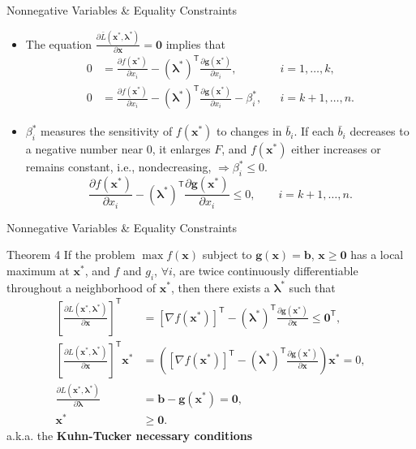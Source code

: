 \documentclass[aspectratio=169,hyperref,UTF8,CJK]{beamer}
\newcommand{\trans}{\mathsf{T}}
\newcommand{\vect}[1]{\boldsymbol{#1}}
\begin{document}
\begin{frame}{Nonnegative Variables \& Equality Constraints}
  \scriptsize
  \begin{itemize}
    \item The equation $\frac{\partial\bar L(\vect{x}^{*},\vect{\lambda}^{*})}{\partial\vect{x}}=\vect{0}$ implies that
      \begin{align*}
        0&=\frac{\partial f(\vect{x}^{*})}{\partial x_i}
          -(\vect{\lambda}^{*})^{\trans}\frac{\partial\vect{g}(\vect{x}^{*})}{\partial x_i},
          &&i=1,\ldots,k,\\
        0&=\frac{\partial f(\vect{x}^{*})}{\partial x_i}
          -(\vect{\lambda}^{*})^{\trans}\frac{\partial\vect{g}(\vect{x}^{*})}{\partial x_i}-\beta_i^{*},
          &&i=k+1,\ldots,n.
      \end{align*}
    \item $\beta_i^{*}$ measures the sensitivity of $f(\vect{x}^{*})$ to changes in $\bar b_i$. If each $\bar b_i$ decreases to a negative number near $0$, it enlarges $F$, and $f(\vect{x}^{*})$ either increases or remains constant, i.e., nondecreasing, $\Longrightarrow\beta_i^{*}\le0$.
      \begin{equation*}
        \frac{\partial f(\vect{x}^{*})}{\partial x_i}
        -(\vect{\lambda}^{*})^{\trans}\frac{\partial\vect{g}(\vect{x}^{*})}{\partial x_i}
        \le0,\qquad i=k+1,\ldots,n.
      \end{equation*}
  \end{itemize}
\end{frame}

\begin{frame}{Nonnegative Variables \& Equality Constraints}
  \scriptsize
  \begin{block}{Theorem 4}
    If the problem $\max f(\vect{x})$ subject to $\vect{g}(\vect{x})=\vect{b}$, $\vect{x}\ge\vect{0}$ has a local maximum at $\vect{x}^{*}$, and $f$ and $g_i$, $\forall i$, are twice continuously differentiable throughout a neighborhood of $\vect{x}^{*}$, then there exists a $\vect{\lambda}^{*}$ such that
    \begin{align*}
      \left[\frac{\partial L(\vect{x}^{*},\vect{\lambda}^{*})}{\partial\vect{x}}\right]^{\trans}
        &=[\nabla f(\vect{x}^{*})]^{\trans}-(\vect{\lambda}^{*})^{\trans}
          \frac{\partial\vect{g}(\vect{x}^{*})}{\partial\vect{x}}\le\vect{0}^{\trans},\\
      \left[\frac{\partial L(\vect{x}^{*},\vect{\lambda}^{*})}{\partial\vect{x}}\right]^{\trans}\vect{x}^{*}
        &=\left([\nabla f(\vect{x}^{*})]^{\trans}-(\vect{\lambda}^{*})^{\trans}
          \frac{\partial\vect{g}(\vect{x}^{*})}{\partial\vect{x}}\right)\vect{x}^{*}=0,\\
      \frac{\partial L(\vect{x}^{*},\vect{\lambda}^{*})}{\partial\vect{\lambda}}
        &=\vect{b}-\vect{g}(\vect{x}^{*})=\vect{0},\\
      \vect{x}^{*}&\ge\vect{0}.
    \end{align*}
    a.k.a. the \textbf{Kuhn-Tucker necessary conditions}
  \end{block}
\end{frame}
\end{document}
